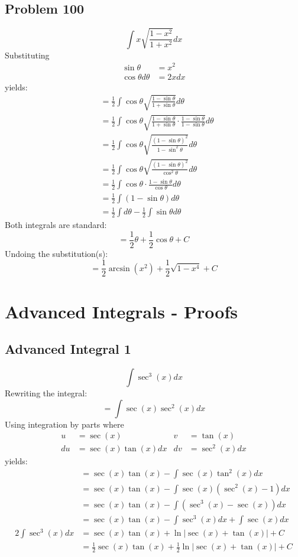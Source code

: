 \documentclass{article}
\begin{document}
\subsection*{Problem 100}
$$\int x\sqrt{\frac{1-x^2}{1+x^2}}dx$$
Substituting
\begin{align*}
\sin\theta&=x^2 \\
\cos\theta d\theta&=2xdx
\end{align*}
yields:
\begin{align*}
&=\frac{1}{2}\int\cos\theta\sqrt{\frac{1-\sin\theta}{1+\sin\theta}}d\theta \\
&=\frac{1}{2}\int\cos\theta\sqrt{\frac{1-\sin\theta}{1+\sin\theta}\cdot\frac{1-\sin\theta}{1-\sin\theta}}d\theta \\
&=\frac{1}{2}\int\cos\theta\sqrt{\frac{(1-\sin\theta)^2}{1-\sin^2\theta}}d\theta \\
&=\frac{1}{2}\int\cos\theta\sqrt{\frac{(1-\sin\theta)^2}{\cos^2\theta}}d\theta \\
&=\frac{1}{2}\int\cos\theta\cdot\frac{1-\sin\theta}{\cos\theta}d\theta \\
&=\frac{1}{2}\int(1-\sin\theta)d\theta \\
&=\frac{1}{2}\int d\theta-\frac{1}{2}\int\sin\theta d\theta
\end{align*}
Both integrals are standard:
$$=\frac{1}{2}\theta+\frac{1}{2}\cos\theta+C$$
Undoing the substitution(s):
$$=\frac{1}{2}\arcsin\left(x^2\right)+\frac{1}{2}\sqrt{1-x^4}+C$$
\newpage
\section{Advanced Integrals - Proofs}
\subsection*{Advanced Integral 1}
$$\int\sec^3(x)dx$$
Rewriting the integral:
$$=\int\sec(x)\sec^2(x)dx$$
Using integration by parts where
\begin{align*}
u&=\sec(x) &v&=\tan(x) \\
du&=\sec(x)\tan(x)dx &dv&=\sec^2(x)dx
\end{align*}
yields:
\begin{align*}
&=\sec(x)\tan(x)-\int\sec(x)\tan^2(x)dx \\
&=\sec(x)\tan(x)-\int\sec(x)(\sec^2(x)-1)dx \\
&=\sec(x)\tan(x)-\int(\sec^3(x)-\sec(x))dx \\
&=\sec(x)\tan(x)-\int\sec^3(x)dx+\int\sec(x)dx \\
2\int\sec^3(x)dx&=\sec(x)\tan(x)+\ln\left|\sec(x)+\tan(x)\right|+C \\
&=\frac{1}{2}\sec(x)\tan(x)+\frac{1}{2}\ln\left|\sec(x)+\tan(x)\right|+C
\end{align*}
\end{document}
